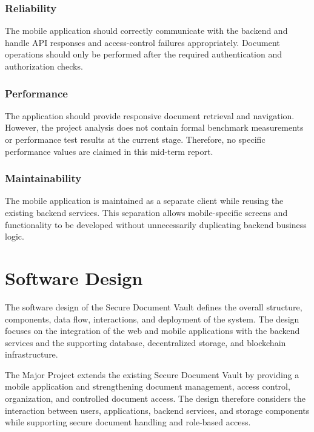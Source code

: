 \documentclass[12pt]{article}
\begin{document}
\subsubsection{Reliability}

The mobile application should correctly communicate with the backend and handle API responses and access-control failures appropriately. Document operations should only be performed after the required authentication and authorization checks.


\subsubsection{Performance}

The application should provide responsive document retrieval and navigation. However, the project analysis does not contain formal benchmark measurements or performance test results at the current stage. Therefore, no specific performance values are claimed in this mid-term report.


\subsubsection{Maintainability}

The mobile application is maintained as a separate client while reusing the existing backend services. This separation allows mobile-specific screens and functionality to be developed without unnecessarily duplicating backend business logic.



\newpage


\section{Software Design}

The software design of the Secure Document Vault defines the overall structure, components, data flow, interactions, and deployment of the system. The design focuses on the integration of the web and mobile applications with the backend services and the supporting database, decentralized storage, and blockchain infrastructure.

The Major Project extends the existing Secure Document Vault by providing a mobile application and strengthening document management, access control, organization, and controlled document access. The design therefore considers the interaction between users, applications, backend services, and storage components while supporting secure document handling and role-based access.
\end{document}
